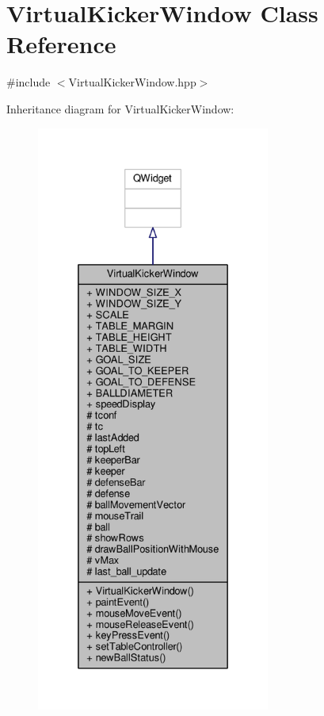 \hypertarget{class_virtual_kicker_window}{}\section{Virtual\+Kicker\+Window Class Reference}
\label{class_virtual_kicker_window}


{\ttfamily \#include $<$Virtual\+Kicker\+Window.\+hpp$>$}



Inheritance diagram for Virtual\+Kicker\+Window\+:\nopagebreak
\begin{figure}[H]
\begin{center}
\leavevmode
\includegraphics[height=550pt]{class_virtual_kicker_window__inherit__graph}
\end{center}
\end{figure}



